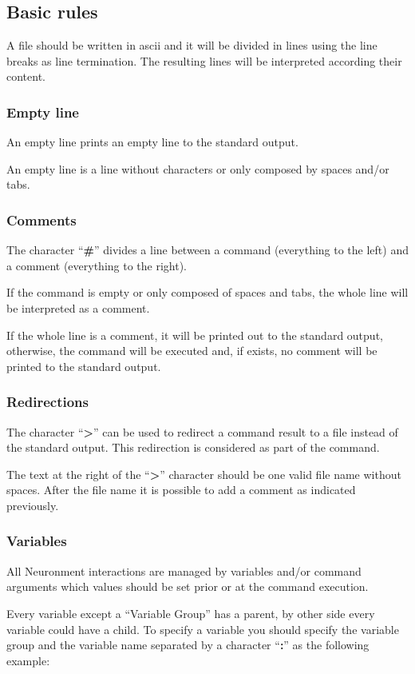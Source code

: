 \subsection{Basic rules}
A  file should be written in ascii and it will be divided in lines using the line breaks as line termination. The resulting lines will be interpreted according their content.

\subsubsection{Empty line}
An empty line prints an empty line to the standard output.

An empty line is a line without characters or only composed by spaces and/or tabs.

\subsubsection{Comments}
The character ``\textbf{\#}'' divides a line between a command (everything to the left) and a comment (everything to the right).

If the command is empty or only composed of spaces and tabs, the whole line will be interpreted as a comment.

If the whole line is a comment, it will be printed out to the standard output, otherwise, the command will be executed and, if exists, no comment will be printed to the standard output.

\subsubsection{Redirections}
The character ``\textbf{>}'' can be used to redirect a command result to a file instead of the standard output. This redirection is considered as part of the command.

The text at the right of the ``\textbf{>}'' character should be one valid file name without spaces. After the file name it is possible to add a comment as indicated previously.

\subsubsection{Variables}
All Neuronment interactions are managed by variables and/or command arguments which values should be set prior or at the command execution.

Every variable except a ``Variable Group'' has a parent, by other side every variable could have a child. To specify a variable you should specify the variable group and the variable name separated by a character ``\textbf{:}'' as the following example:

